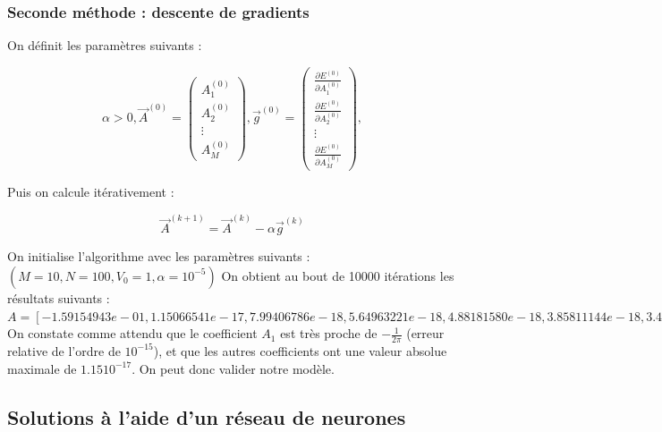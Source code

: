 \documentclass[]{article}
\begin{document}
\subsubsection{Seconde méthode : descente de gradients}

On définit les paramètres suivants :

\begin{equation}
    \alpha>0, 
    \Vec{A}^{(0)} = \begin{pmatrix}
                A_1^{(0)} \\
                A_2^{(0)} \\
                \vdots \\
                A_M^{(0)}
              \end{pmatrix},
    \Vec{g}^{(0)} = \begin{pmatrix}
                \frac{\partial E^{(0)}}{\partial A_1^{(0)}} \\
                \frac{\partial E^{(0)}}{\partial A_2^{(0)}} \\
                \vdots \\
                \frac{\partial E^{(0)}}{\partial A_M^{(0)}}
              \end{pmatrix},     
\label{eq:définition descente de gradients}
\end{equation}

Puis on calcule itérativement :

\begin{equation}
    \Vec{A}^{(k+1)} = \Vec{A}^{(k)} - \alpha\Vec{g}^{(k)} 
\label{eq:équation récurrence descente gradients}
\end{equation}

On initialise l'algorithme avec les paramètres suivants :
$(M=10, N=100, V_0 = 1, \alpha = 10^{-5})$
On obtient au bout de 10000 itérations les résultats suivants : \\
$A = [-1.59154943e-01,  1.15066541e-17,  7.99406786e-18,  5.64963221e-18,
4.88181580e-18,  3.85811144e-18,  3.46024465e-18,  2.88560910e-18,
2.81846501e-18, 2.43172156e-18]$ \\
On constate comme attendu que le coefficient $A_1$ est très proche de $-\frac{1}{2\pi}$ (erreur relative de l'ordre de $10^{-15}$), et que les autres coefficients ont une valeur absolue maximale de $1.15 10^{-17}$.
On peut donc valider notre modèle.


\subsection{Solutions à l'aide d'un réseau de neurones}
\end{document}
